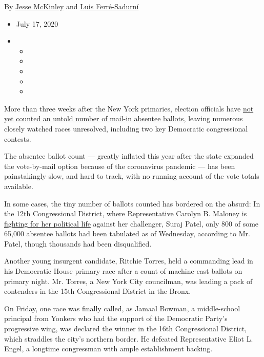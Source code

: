 By \href{https://www.nytimes3xbfgragh.onion/by/jesse-mckinley}{Jesse
McKinley} and
\href{https://www.nytimes3xbfgragh.onion/by/luis-ferre-sadurni}{Luis
Ferré-Sadurní}

\begin{itemize}
\item
  July 17, 2020
\item
  \begin{itemize}
  \item
  \item
  \item
  \item
  \item
  \end{itemize}
\end{itemize}

More than three weeks after the New York primaries, election officials
have
\href{https://www.nytimes3xbfgragh.onion/2020/08/03/nyregion/nyc-mail-ballots-voting.html}{not
yet counted an untold number of mail-in absentee ballots}, leaving
numerous closely watched races unresolved, including two key Democratic
congressional contests.

The absentee ballot count --- greatly inflated this year after the state
expanded the vote-by-mail option because of the coronavirus pandemic ---
has been painstakingly slow, and hard to track, with no running account
of the vote totals available.

In some cases, the tiny number of ballots counted has bordered on the
absurd: In the 12th Congressional District, where Representative Carolyn
B. Maloney is \href{https://web.enrboenyc.us/CD235630.html}{fighting for
her political life} against her challenger, Suraj Patel, only 800 of
some 65,000 absentee ballots had been tabulated as of Wednesday,
according to Mr. Patel, though thousands had been disqualified.

Another young insurgent candidate, Ritchie Torres, held a commanding
lead in his Democratic House primary race after a count of machine-cast
ballots on primary night. Mr. Torres, a New York City councilman, was
leading a pack of contenders in the 15th Congressional District in the
Bronx.

On Friday, one race was finally called, as Jamaal Bowman, a
middle-school principal from Yonkers who had the support of the
Democratic Party's progressive wing, was declared the winner in the 16th
Congressional District, which straddles the city's northern border. He
defeated Representative Eliot L. Engel, a longtime congressman with
ample establishment backing.

